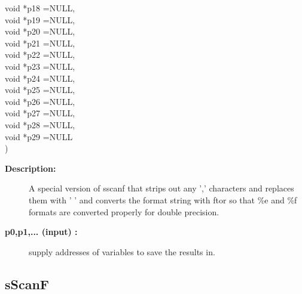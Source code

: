 \begin{flushleft}
{\hspace{\otherStuffIncludeArgIndent}void *p18  =NULL,\\ 
\hspace{\otherStuffIncludeArgIndent}void *p19  =NULL,\\ 
\hspace{\otherStuffIncludeArgIndent}void *p20  =NULL,\\ 
\hspace{\otherStuffIncludeArgIndent}void *p21  =NULL,\\ 
\hspace{\otherStuffIncludeArgIndent}void *p22  =NULL,\\ 
\hspace{\otherStuffIncludeArgIndent}void *p23  =NULL,\\ 
\hspace{\otherStuffIncludeArgIndent}void *p24  =NULL,\\ 
\hspace{\otherStuffIncludeArgIndent}void *p25  =NULL,\\ 
\hspace{\otherStuffIncludeArgIndent}void *p26  =NULL,\\ 
\hspace{\otherStuffIncludeArgIndent}void *p27  =NULL,\\ 
\hspace{\otherStuffIncludeArgIndent}void *p28  =NULL,\\ 
\hspace{\otherStuffIncludeArgIndent}void *p29  =NULL\\ 
\hspace{\otherStuffIncludeArgIndent})
}\end{flushleft}
\begin{description}
\item[{\bf Description:}] 
   A special version of sscanf that strips out any ',' characters
 and replaces them with ' ' and converts the format string with ftor so that
 \%e and \%f formats are converted properly for double precision.
\item[{\bf p0,p1,... (input) :}]  supply addresses of variables to save the results in.
\end{description}
\subsection{sScanF}
 
